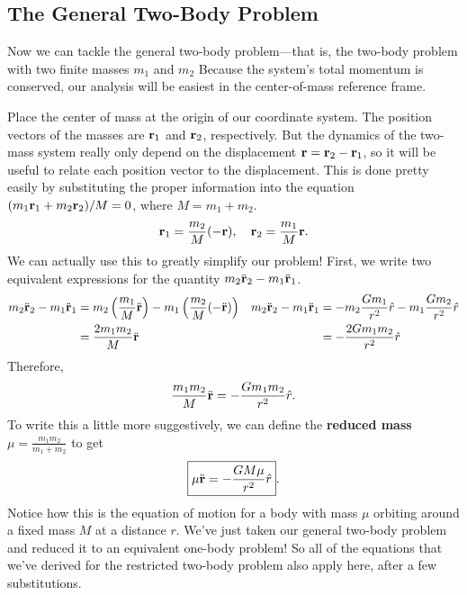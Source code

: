 \documentclass[../a062main.tex]{subfiles}
\begin{document}
\subsection*{The General Two-Body Problem}
Now we can tackle the general two-body problem---that is, the two-body problem with two finite masses $m_1$ and $m_2$
Because the system's total momentum is conserved, our analysis will be easiest in the center-of-mass reference frame.

Place the center of mass at the origin of our coordinate system.
The position vectors of the masses are $\mathbf{r}_1$ and $\mathbf{r}_2$, respectively.
But the dynamics of the two-mass system really only depend on the displacement $\mathbf{r} = \mathbf{r}_2 - \mathbf{r}_1$, so it will be useful to relate each position vector to the displacement.
This is done pretty easily by substituting the proper information into the equation $(m_1\mathbf{r}_1 + m_2\mathbf{r}_2)/M = 0$, where $M = m_1 + m_2$.
\[ \mathbf{r}_1 = \frac{m_2}{M} (-\mathbf{r}), \quad \mathbf{r}_2 = \frac{m_1}{M} \mathbf{r}. \]
We can actually use this to greatly simplify our problem!
First, we write two equivalent expressions for the quantity $m_2\ddot{\mathbf{r}}_2 - m_1\ddot{\mathbf{r}}_1$.
\begin{align*}
    m_2\ddot{\mathbf{r}}_2 - m_1\ddot{\mathbf{r}}_1 &= m_2 \left( \frac{m_1}{M}\ddot{\mathbf{r}} \right) - m_1 \left( \frac{m_2}{M} (-\ddot{\mathbf{r}}) \right) & m_2\ddot{\mathbf{r}}_2 - m_1\ddot{\mathbf{r}}_1 &= -m_2 \frac{Gm_1}{r^2}\hat{r} - m_1 \frac{Gm_2}{r^2}\hat{r} \\
    &= \frac{2m_1m_2}{M}\ddot{\mathbf{r}} & &= -\frac{2Gm_1m_2}{r^2}\hat{r}
\end{align*}
Therefore,
\[ \frac{m_1m_2}{M}\ddot{\mathbf{r}} = -\frac{Gm_1m_2}{r^2}\hat{r}. \]
To write this a little more suggestively, we can define the \textbf{reduced mass} $\mu = \frac{m_1m_2}{m_1 + m_2}$ to get
\[ \boxed{\mu \ddot{\mathbf{r}} = -\frac{GM\mu}{r^2}\hat{r}}. \]
Notice how this is the equation of motion for a body with mass $\mu$ orbiting around a fixed mass $M$ at a distance $r$.
We've just taken our general two-body problem and reduced it to an equivalent one-body problem!
So all of the equations that we've derived for the restricted two-body problem also apply here, after a few substitutions.
\end{document}
